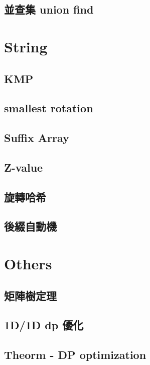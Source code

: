 \subsection{並查集 union find}




\section{String}

\subsection{KMP}

\subsection{smallest rotation}

\subsection{Suffix Array}

\subsection{Z-value}

\subsection{旋轉哈希}

\subsection{後綴自動機}


\section{Others}

\subsection{矩陣樹定理}

\subsection{1D/1D dp 優化}

\subsection{Theorm - DP optimization}

